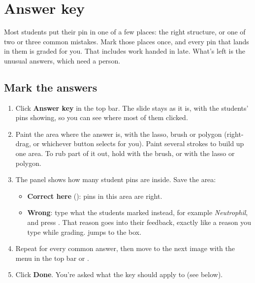 \section{Answer key}\label{sec:answer-key}

\label{sec:answer-key:answer-key}

Most students put their pin in one of a few places: the right structure, or one of two or three common mistakes. Mark those places once, and every pin that lands in them is graded for you. That includes work handed in late. What's left is the unusual answers, which need a person.


\subsection{Mark the answers}\label{sec:answer-key:mark-the-answers}

\begin{enumerate}[topsep=2pt, itemsep=2pt]
\item Click \textbf{Answer key} in the top bar. The slide stays as it is, with the students' pins showing, so you can see where most of them clicked.
\item Paint the area where the answer is, with the lasso, brush or polygon (right-drag, or whichever button selects for you). Paint several strokes to build up one area. To rub part of it out, hold \keycap{\optsym{}} with the brush, or \keycap{\shiftsym{}} with the lasso or polygon.
\item The panel shows how many student pins are inside. Save the area:
\begin{itemize}[topsep=1pt]
\item \textbf{\checksym{} Correct here} (): pins in this area are right.
\item \textbf{\crosssym{} Wrong}: type what the students marked instead, for example \emph{Neutrophil}, and press \keycap{\returnsym{}}. That reason goes into their feedback, exactly like a reason you type while grading.  jumps to the box.
\end{itemize}
\item Repeat for every common answer, then move to the next image with the menu in the top bar or \keycap{\cmdsym{}}\keyplus{}\keycap{\ensuremath{\rightarrow}}.
\item Click \textbf{Done}. You're asked what the key should apply to (see below).
\end{enumerate}

